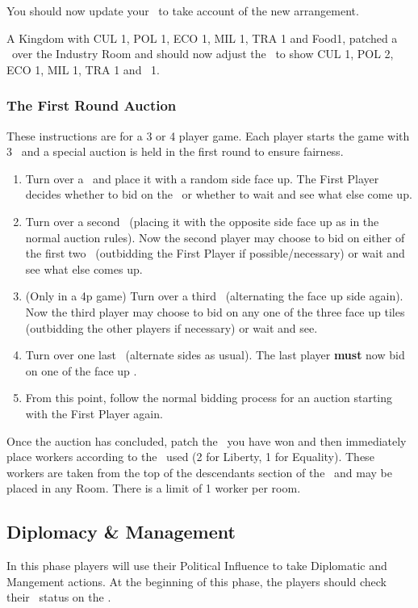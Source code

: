 \documentclass[10pt,twocolumn]{article}
\begin{document}
You should now update your \psb\ to take account of the new arrangement.
\begin{BoxExample}
A Kingdom with CUL 1, POL 1, ECO 1, MIL 1, TRA 1 and Food1, patched a \landcard\ over the Industry Room and should now adjust the \psb\ to show CUL 1, POL 2, ECO 1, MIL 1, TRA 1 and \minerals\ 1.
\end{BoxExample}


\subsubsection{The First Round Auction}
These instructions are for a 3 or 4 player game.
Each player starts the game with 3 \money\ and a special auction is held in the first round to ensure fairness. 
\begin{enumerate}
\item Turn over a \landcard\ and place it with a random side face up. The First Player decides whether to bid on the \landcard\ or whether to wait and see what else come up.
\item Turn over a second \landcard\ (placing it with the opposite side face up as in the normal auction rules). Now the second player may choose to bid on either of the first two \landcards\ (outbidding the First Player if possible/necessary) or wait and see what else comes up.
\item (Only in a 4p game) Turn over a third \landcard\ (alternating the face up side again). Now the third player may choose to bid on any one of the three face up tiles (outbidding the other players if necessary) or wait and see.
\item Turn over one last \landcard\ (alternate sides as usual). The last player \textbf{must} now bid on one of the face up \landcards.
\item From this point, follow the normal bidding process for an auction starting with the First Player again.
\end{enumerate}
Once the auction has concluded, patch the \landcard\ you have won and then immediately place workers according to the \baseland\ used (2 for Liberty, 1 for Equality). These workers are taken from the top of the descendants section of the \psb\ and may be placed in any Room. There is a limit of 1 worker per room.
\subsection{Diplomacy \& Management}
In this phase players will use their Political Influence to take Diplomatic and Mangement actions. At the beginning of this phase, the players should check their \pol\ status on the \psb.
\end{document}
